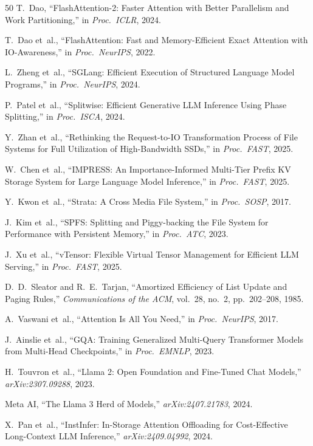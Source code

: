 \documentclass[conference]{IEEEtran}
\begin{document}
\begin{thebibliography}{50}
 T.~Dao, ``FlashAttention-2: Faster Attention with Better Parallelism and Work Partitioning,'' in \textit{Proc.\ ICLR}, 2024.

 T.~Dao et~al., ``FlashAttention: Fast and Memory-Efficient Exact Attention with IO-Awareness,'' in \textit{Proc.\ NeurIPS}, 2022.

 L.~Zheng et~al., ``SGLang: Efficient Execution of Structured Language Model Programs,'' in \textit{Proc.\ NeurIPS}, 2024.

 P.~Patel et~al., ``Splitwise: Efficient Generative LLM Inference Using Phase Splitting,'' in \textit{Proc.\ ISCA}, 2024.

 Y.~Zhan et~al., ``Rethinking the Request-to-IO Transformation Process of File Systems for Full Utilization of High-Bandwidth SSDs,'' in \textit{Proc.\ FAST}, 2025.

 W.~Chen et~al., ``IMPRESS: An Importance-Informed Multi-Tier Prefix KV Storage System for Large Language Model Inference,'' in \textit{Proc.\ FAST}, 2025.

 Y.~Kwon et~al., ``Strata: A Cross Media File System,'' in \textit{Proc.\ SOSP}, 2017.

 J.~Kim et~al., ``SPFS: Splitting and Piggy-backing the File System for Performance with Persistent Memory,'' in \textit{Proc.\ ATC}, 2023.

 J.~Xu et~al., ``vTensor: Flexible Virtual Tensor Management for Efficient LLM Serving,'' in \textit{Proc.\ FAST}, 2025.

 D.~D.~Sleator and R.~E.~Tarjan, ``Amortized Efficiency of List Update and Paging Rules,'' \textit{Communications of the ACM}, vol.~28, no.~2, pp.~202--208, 1985.

 A.~Vaswani et~al., ``Attention Is All You Need,'' in \textit{Proc.\ NeurIPS}, 2017.

 J.~Ainslie et~al., ``GQA: Training Generalized Multi-Query Transformer Models from Multi-Head Checkpoints,'' in \textit{Proc.\ EMNLP}, 2023.

 H.~Touvron et~al., ``Llama 2: Open Foundation and Fine-Tuned Chat Models,'' \textit{arXiv:2307.09288}, 2023.

 Meta AI, ``The Llama 3 Herd of Models,'' \textit{arXiv:2407.21783}, 2024.

 X.~Pan et~al., ``InstInfer: In-Storage Attention Offloading for Cost-Effective Long-Context LLM Inference,'' \textit{arXiv:2409.04992}, 2024.


\end{thebibliography}
\end{document}
